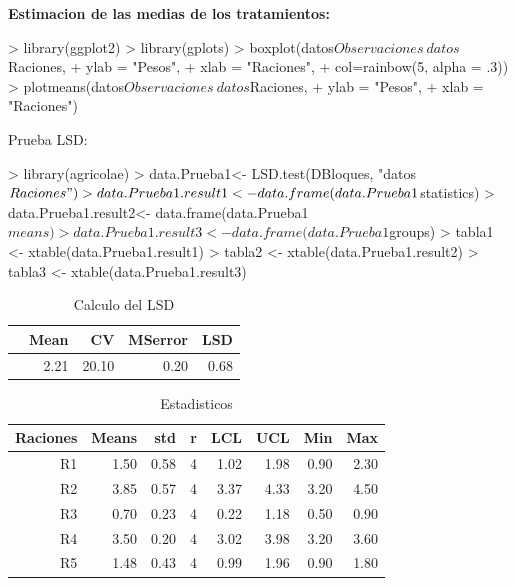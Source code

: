 \documentclass[12pt,letterpaper]{report}
\begin{document}
\textbf{Estimacion de las medias de los tratamientos:}
\begin{Schunk}
\begin{Sinput}
> library(ggplot2)
> library(gplots)
> boxplot(datos$Observaciones~datos$Raciones,
+         ylab = "Pesos",
+         xlab = "Raciones",
+         col=rainbow(5, alpha = .3))
> plotmeans(datos$Observaciones~datos$Raciones,
+           ylab = "Pesos",
+           xlab = "Raciones")
\end{Sinput}
\end{Schunk}
\newpage
Prueba LSD:
\begin{Schunk}
\begin{Sinput}
> library(agricolae)
> data.Prueba1<- LSD.test(DBloques, "datos$Raciones")
> data.Prueba1.result1<- data.frame(data.Prueba1$statistics)
> data.Prueba1.result2<- data.frame(data.Prueba1$means)
> data.Prueba1.result3<- data.frame(data.Prueba1$groups)
> tabla1 <- xtable(data.Prueba1.result1)
> tabla2 <- xtable(data.Prueba1.result2)
> tabla3 <- xtable(data.Prueba1.result3)
\end{Sinput}
\end{Schunk}

\begin{table}[ht]
\centering
\begin{tabular}{rrrrr}
  \hline
 & Mean & CV & MSerror & LSD \\ 
  \hline
  & 2.21 & 20.10 & 0.20 & 0.68 \\ 
   \hline
\end{tabular}
\caption{Calculo del LSD}
\end{table}

\begin{table}[ht]
\centering
\begin{tabular}{rrrrrrrr}
  \hline
  Raciones  & Means & std & r & LCL & UCL & Min & Max \\ 
  \hline
  R1 & 1.50 & 0.58 &   4 & 1.02 & 1.98 & 0.90 & 2.30 \\ 
  R2 & 3.85 & 0.57 &   4 & 3.37 & 4.33 & 3.20 & 4.50 \\ 
  R3 & 0.70 & 0.23 &   4 & 0.22 & 1.18 & 0.50 & 0.90 \\ 
  R4 & 3.50 & 0.20 &   4 & 3.02 & 3.98 & 3.20 & 3.60 \\ 
  R5 & 1.48 & 0.43 &   4 & 0.99 & 1.96 & 0.90 & 1.80 \\ 
   \hline
\end{tabular}
\caption{Estadisticos}
\end{table}
\end{document}
